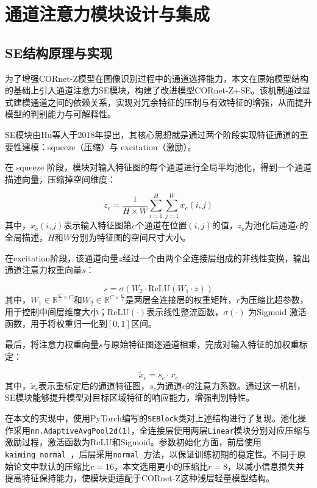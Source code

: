 \section{通道注意力模块设计与集成}

\subsection{SE结构原理与实现}

为了增强CORnet-Z模型在图像识别过程中的通道选择能力，本文在原始模型结构的基础上引入通道注意力SE模块，构建了改进模型CORnet-Z+SE。该机制通过显式建模通道之间的依赖关系，实现对冗余特征的压制与有效特征的增强，从而提升模型的判别能力与可解释性。

SE模块由Hu等人于2018年提出\cite{hu2018squeeze}，其核心思想就是通过两个阶段实现特征通道的重要性建模：squeeze（压缩）与 excitation（激励）。

在 squeeze 阶段，模块对输入特征图的每个通道进行全局平均池化，得到一个通道描述向量，压缩掉空间维度：

\begin{equation}
	z_c = 
	\frac{1}{H \times W} 
	\sum_{i=1}^{H} \sum_{j=1}^{W} x_c(i, j)
	\label{eq:se_squeeze}
\end{equation}
其中，$x_c(i,j)$表示输入特征图第$c$个通道在位置$(i,j)$的值，$z_c$为池化后通道$c$的全局描述，$H$和$W$分别为特征图的空间尺寸大小。

在excitation阶段，该通道向量$z$经过一个由两个全连接层组成的非线性变换，输出通道注意力权重向量$s$：

\begin{equation}
	s = \sigma \left( W_2 \cdot \text{ReLU} \left( W_1 \cdot z \right) \right)
	\label{eq:se_excitation}
\end{equation}
其中，$W_1 \in \mathbb{R}^{\frac{C}{r} \times C}$和$W_2 \in \mathbb{R}^{C \times \frac{C}{r}}$是两层全连接层的权重矩阵，$r$为压缩比超参数，用于控制中间层维度大小；$\text{ReLU}(\cdot)$表示线性整流函数，$\sigma(\cdot)$ 为Sigmoid 激活函数，用于将权重归一化到$[0,1]$区间。

最后，将注意力权重向量$s$与原始特征图逐通道相乘，完成对输入特征的加权重标定：

\begin{equation}
	\tilde{x}_c = s_c \cdot x_c
	\label{eq:se_scale}
\end{equation}
其中，$\tilde{x}_c$表示重标定后的通道特征图，$s_c$为通道$c$的注意力系数。通过这一机制，SE模块能够提升模型对目标区域特征的响应能力，增强判别特性。

在本文的实现中，使用PyTorch编写的\texttt{SEBlock}类对上述结构进行了复现。池化操作采用\texttt{nn.AdaptiveAvgPool2d(1)}，全连接层使用两层\texttt{Linear}模块分别对应压缩与激励过程，激活函数为ReLU和Sigmoid。参数初始化方面，前层使用\texttt{kaiming\_normal\_}，后层采用\texttt{normal\_}方法，以保证训练初期的稳定性。不同于原始论文中默认的压缩比$r=16$，本文选用更小的压缩比$r=8$，以减小信息损失并提高特征保持能力，使模块更适配于CORnet-Z这种浅层轻量模型结构。

